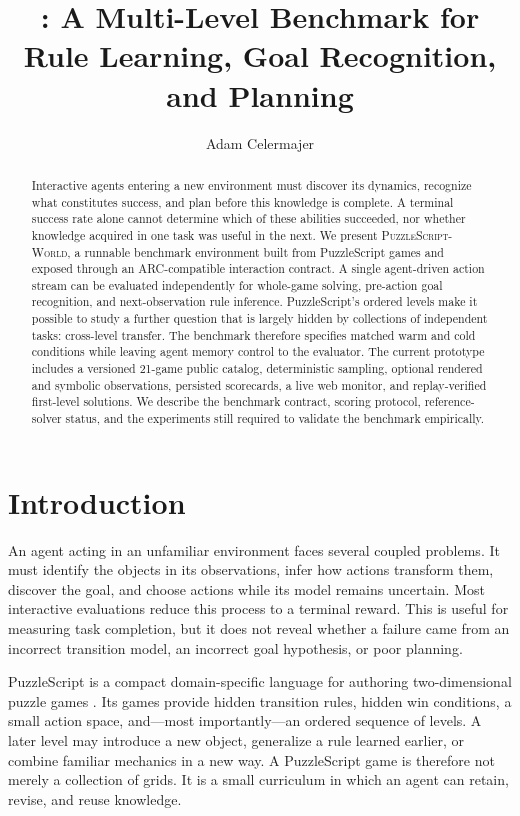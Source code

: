 \documentclass[sigconf,nonacm]{acmart}
\title{\benchmarkname: A Multi-Level Benchmark for Rule Learning,
Goal Recognition, and Planning}
\author{Adam Celermajer}
\affiliation{%
  \institution{Bar-Ilan University}
  \department{Department of Computer Science and Artificial Intelligence}
  \city{Ramat Gan}
  \country{Israel}
}
\newcommand{\benchmarkname}{\textsc{PuzzleScript-World}}
\begin{document}
\begin{abstract}
Interactive agents entering a new environment must discover its dynamics,
recognize what constitutes success, and plan before this knowledge is complete.
A terminal success rate alone cannot determine which of these abilities
succeeded, nor whether knowledge acquired in one task was useful in the next.
We present \benchmarkname, a runnable benchmark environment built from
PuzzleScript games and exposed through an ARC-compatible interaction contract.
A single agent-driven action stream can be evaluated independently for
whole-game solving, pre-action goal recognition, and next-observation rule
inference. PuzzleScript's ordered levels make it possible to study a further
question that is largely hidden by collections of independent tasks:
cross-level transfer. The benchmark therefore specifies matched warm and cold
conditions while leaving agent memory control to the evaluator. The current
prototype includes a versioned 21-game public catalog, deterministic sampling,
optional rendered and symbolic observations, persisted scorecards, a live web
monitor, and replay-verified first-level solutions. We describe the benchmark
contract, scoring protocol, reference-solver status, and the experiments still
required to validate the benchmark empirically.
\end{abstract}


\maketitle

\section{Introduction}

An agent acting in an unfamiliar environment faces several coupled problems.
It must identify the objects in its observations, infer how actions transform
them, discover the goal, and choose actions while its model remains uncertain.
Most interactive evaluations reduce this process to a terminal reward. This is
useful for measuring task completion, but it does not reveal whether a failure
came from an incorrect transition model, an incorrect goal hypothesis, or poor
planning.

PuzzleScript is a compact domain-specific language for authoring two-dimensional
puzzle games \cite{lavelle2013puzzlescript}. Its games provide hidden transition
rules, hidden win conditions, a small action space, and---most importantly---an
ordered sequence of levels. A later level may introduce a new object, generalize
a rule learned earlier, or combine familiar mechanics in a new way. A
PuzzleScript game is therefore not merely a collection of grids. It is a small
curriculum in which an agent can retain, revise, and reuse knowledge.
\end{document}
